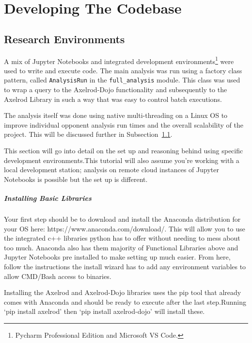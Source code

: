 \chapter{Developing The Codebase}\label{ch:developingthecodebase}


\section{Research Environments}\label{subsec:settingUpAResearchEnvironment}
A mix of Jupyter Notebooks and integrated development environments\footnote{Pycharm Professional Edition and Microsoft VS Code.} were used to write and execute code.
The main analysis was run using a factory class pattern, called \texttt{AnalysisRun} in the \texttt{full_analysis} module.
This class was used to wrap a query to the Axelrod-Dojo functionality and subsequently to the Axelrod Library in such a way that was easy to control batch executions.

The analysis itself was done using native multi-threading on a Linux OS to improve individual opponent analysis run times and the overall scalability of the project.
This will be discussed further in Subsection~\ref{subsec:settingUpAResearchEnvironment}.

This section will go into detail on the set up and reasoning behind using specific development environments.This tutorial will also assume you're working with a local development station;
analysis on remote cloud instances of Jupyter Notebooks is possible but the set up is different.

\paragraph{Installing Basic Libraries}
Your first step should be to download and install the Anaconda distribution for your OS here: https://www.anaconda.com/download/.
This will allow you to use the integrated c++ libraries python has to offer without needing to mess about too much.
Anaconda also has them majority of Functional Libraries above and Jupyter Notebooks pre installed to make setting up much easier.
From here, follow the instructions the install wizard has to add any environment variables to allow CMD/Bash access to binaries.

Installing the Axelrod and Axelrod-Dojo libraries uses the pip tool that already comes with Anaconda and should be ready to execute after the last step.Running `pip install axelrod' then `pip install axelrod-dojo' will install these.

